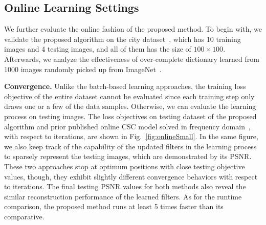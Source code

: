 \subsection{Online Learning Settings}
We further evaluate the online fashion of the proposed method. To begin with, we validate the proposed algorithm on the city dataset~\citep{zeiler2010deconvolutional}, which has 10 training images and 4 testing images, and all of them has the size of $100 \times 100$. Afterwards, we analyze the effectiveness of over-complete dictionary learned from 1000 images randomly picked up from ImageNet~\cite{deng2009imagenet}.

{\bfseries Convergence.} Unlike the batch-based learning approaches, the training loss objective of the entire dataset cannot be evaluated since each training step only draws one or a few of the data samples. Otherwise, we can evaluate the learning process on testing images. The loss objectives on testing dataset of the proposed algorithm and prior published online CSC model solved in frequency domain~\citep{liu-2018-first}, with respect to iterations, are shown in Fig.~\ref{fig:onlineSmall}. In the same figure, we also keep track of the capability of the updated filters in the learning process to sparsely represent the testing images, which are demonstrated by its PSNR. These two approaches stop at optimum positions with close testing objective values, though, they exhibit slightly different convergence behaviors with respect to iterations. The final testing PSNR values for both methods also reveal the similar reconstruction performance of the learned filters. As for the runtime comparison, the proposed method runs at least 5 times faster than its comparative.


